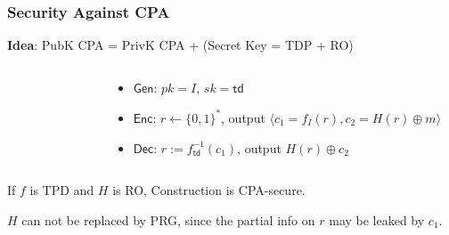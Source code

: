\begin{frame}\frametitle{Security Against CPA}
\textbf{Idea}: PubK CPA = PrivK CPA + (Secret Key = TDP + RO)
\begin{columns}[t]
\begin{column}{5cm}
\begin{figure}[t]
\begin{center}

\end{center}
\end{figure}\end{column}
\begin{column}{5cm}
\begin{construction}
\begin{itemize}
\item $\mathsf{Gen}$: $pk =  I $, $sk = \mathsf{td} $
\item $\mathsf{Enc}$: $r \gets \{0,1\}^*$, output $\langle c_{1}=f_I(r), c_{2}=H(r)\oplus m\rangle$
\item $\mathsf{Dec}$: $r := f_{\mathsf{td}}^{-1}(c_1)$, output $H(r)\oplus c_2$
\end{itemize}
\end{construction}
\end{column}
\end{columns}
\begin{theorem}
If $f$ is TPD and $H$ is RO, Construction is CPA-secure.
\end{theorem}
\alert{$H$ can not be replaced by PRG, since the partial info on $r$ may be leaked by $c_1$.}
\end{frame}

